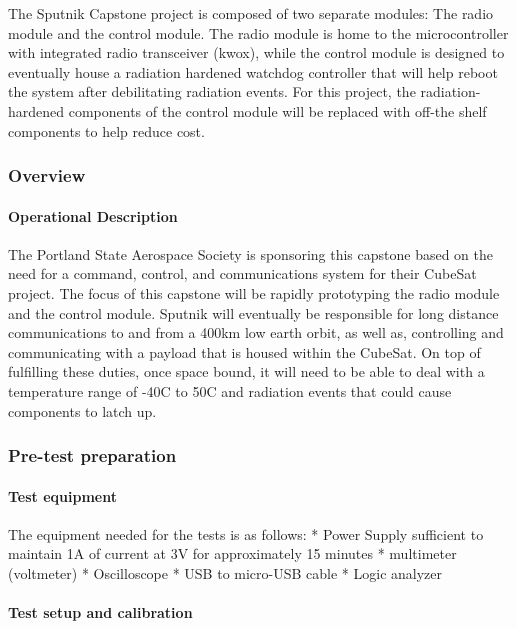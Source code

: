 \documentclass[]{article}
\let\oldparagraph\paragraph
\renewcommand{\paragraph}[1]{\oldparagraph{#1}\mbox{}}
\begin{document}
The Sputnik Capstone project is composed of two separate modules: The
radio module and the control module. The radio module is home to the
microcontroller with integrated radio transceiver (kwox), while the
control module is designed to eventually house a radiation hardened
watchdog controller that will help reboot the system after debilitating
radiation events. For this project, the radiation-hardened components of
the control module will be replaced with off-the shelf components to
help reduce cost.

\subsubsection{Overview}\label{overview}

\paragraph{Operational Description}\label{operational-description}

The Portland State Aerospace Society is sponsoring this capstone based
on the need for a command, control, and communications system for their
CubeSat project. The focus of this capstone will be rapidly prototyping
the radio module and the control module. Sputnik will eventually be
responsible for long distance communications to and from a 400km low
earth orbit, as well as, controlling and communicating with a payload
that is housed within the CubeSat. On top of fulfilling these duties,
once space bound, it will need to be able to deal with a temperature
range of -40C to 50C and radiation events that could cause components to
latch up.

\subsubsection{Pre-test preparation}\label{pre-test-preparation}

\paragraph{Test equipment}\label{test-equipment}

The equipment needed for the tests is as follows: * Power Supply
sufficient to maintain 1A of current at 3V for approximately 15 minutes
* multimeter (voltmeter) * Oscilloscope * USB to micro-USB cable * Logic
analyzer

\paragraph{Test setup and calibration}\label{test-setup-and-calibration}
\end{document}
